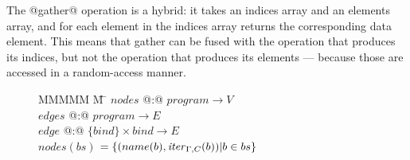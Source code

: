 The @gather@ operation is a hybrid: it takes an indices array and an elements array, and for each element in the indices array returns the corresponding data element. This means that gather can be fused with the operation that produces its indices, but not the operation that produces its elements --- because those are accessed in a random-access manner. 



\begin{figure}
\begin{tabbing}
MMMMM       \= M  \= \kill
$nodes$     \> @:@ \> $program \to V$              \\
$edges$     \> @:@ \> $program \to E$              \\
$edge$      \> @:@ \> $\{bind\} \times bind \to E$ 
\\[1ex]
$nodes(bs)$ \> $= \{(name(b), \mathit{iter}_{\Gamma,C}(b)) | b \in bs\}$       
\\[2ex]


\end{tabbing}
\end{figure}
